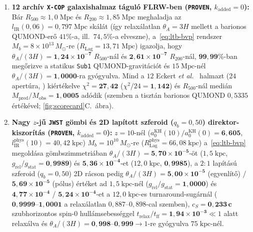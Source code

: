 \documentclass[11pt,a4paper]{article}
\begin{document}
\begin{enumerate}
  \item \textbf{12 archív {\upshape\texttt{X-COP}} galaxishalmaz táguló FLRW-ben ({\upshape\texttt{PROVEN}}, $k_{\mathrm{added}} = 0$):} Bár $R_{500} \approx 1{,}0\;\mathrm{Mpc}$ és $R_{200} \approx 1{,}85\;\mathrm{Mpc}$ meghaladja az $l_{\mathrm{IR}}(0{,}06) = 0{,}797\;\mathrm{Mpc}$ skálát (így relaxálatlan $\theta_A = 3H$ mellett a barionos QUMOND-erő $41\%$-a, ill.\ $74{,}5\%$-a elveszne), a~\eqref{eq:ltb-bvp} rendszer $M_b = 8\times 10^{13}\,M_\odot$-re ($R_{\mathrm{Lag}} = 13{,}71\;\mathrm{Mpc}$) igazolja, hogy $\theta_A/(3H) = \mathbf{1{,}24\times 10^{-7}}$ $R_{500}$-nál és $\mathbf{2{,}61\times 10^{-7}}$ $R_{200}$-nál, $\mathbf{99{,}99\%}$-ban megőrizve a statikus {\upshape\texttt{Sub1}} QUMOND-gravitációt és $15\;\mathrm{Mpc}$-nél $\theta_A/(3H) = \mathbf{1{,}0000}$-ra gyógyulva. Mind a $12$ Eckert \textit{et al.}\ \cite{Eckert2019XCOP} halmazt ($24$ apertúra, ) kiértékelve $\chi^2 = \mathbf{27{,}42}$ ($\chi^2/24 = \mathbf{1{,}142}$) és $R_{500}$-nál medián $M_{\mathrm{pred}}/M_{\mathrm{obs}} = \mathbf{1{,}0005}$ adódik (szemben a tisztán barionos QUMOND $0{,}5335$ értékével; \ref{fig:scorecard}C.~ábra).
  \item \textbf{Nagy $z$-jű {\upshape\texttt{JWST}} gömbi és 2D lapított szferoid ($q_b = 0{,}50$) direktor-kiszorítás ({\upshape\texttt{PROVEN}}, $k_{\mathrm{added}} = 0$):} $z = 10$-nél ($a_0^{\mathrm{KH}}(10)/a_0^{\mathrm{KH}}(0) = \mathbf{6{,}605}$, $l_{\mathrm{IR}}^{\mathrm{phys}}(10) = 40{,}42\;\mathrm{kpc}$) \cite{McGaugh2024JWST} $M_b = 10^{10}\,M_\odot$-re ($R_{\mathrm{Lag}}^{\mathrm{phys}} = 66{,}08\;\mathrm{kpc}$) a~\eqref{eq:ltb-bvp} megoldása gömbszimmetriában $\theta_A/(3H) = \mathbf{5{,}70\times 10^{-5}}$-öt ($1{,}5\;\mathrm{kpc}$, $g_{\mathrm{rel}}/g_{\mathrm{stat}} = \mathbf{0{,}9989}$) és $\mathbf{5{,}36\times 10^{-4}}$-et ($12{,}0\;\mathrm{kpc}$, $\mathbf{0{,}9985}$), a $2\!:\!1$ lapítású szferoid ($q_b = 0{,}50$) 2D rácson pedig $\theta_A/(3H) = \mathbf{5{,}00\times 10^{-5}}$ (egyenlítő) / $\mathbf{5{,}69\times 10^{-5}}$ (pólus) értéket ad $1{,}5\;\mathrm{kpc}$-nél ($g_{\mathrm{rel}}/g_{\mathrm{stat}} = \mathbf{1{,}0000}$) és $\mathbf{4{,}77\times 10^{-4}}$ / $\mathbf{5{,}24\times 10^{-4}}$-et a $12{,}0\;\mathrm{kpc}$-es turnaround-sugárnál ($\mathbf{0{,}9999\text{--}1{,}0001}$ a relaxálatlan $0{,}887\text{--}0{,}898$-cal szemben), $c_S = \mathbf{0{,}233\,c}$ szubhorizontos spin-0 hullámsebességgel $t_{\mathrm{relax}}/t_{\mathrm{ff}} = \mathbf{1{,}94\times 10^{-3}} \ll 1$ alatt relaxálva és $\theta_A/(3H) = \mathbf{0{,}998\text{--}0{,}999} \to 1$-re gyógyulva $75\;\mathrm{kpc}$-nél.

\end{enumerate}
\end{document}
